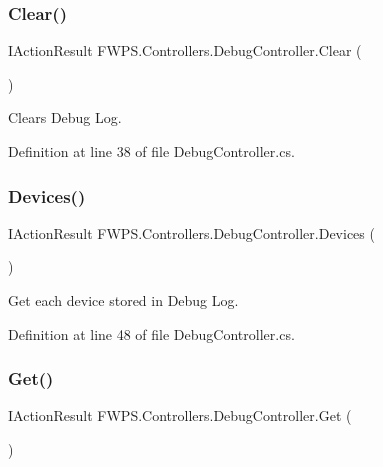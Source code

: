 \subsubsection{\texorpdfstring{Clear()}{Clear()}}
{\footnotesize\ttfamily I\+Action\+Result F\+W\+P\+S.\+Controllers.\+Debug\+Controller.\+Clear (\begin{DoxyParamCaption}{ }\end{DoxyParamCaption})}



Clears Debug Log. 



Definition at line 38 of file Debug\+Controller.\+cs.

\mbox{\label{class_f_w_p_s_1_1_controllers_1_1_debug_controller_a43de8949791ed24a59188323e1e9f9cd}} 
\subsubsection{\texorpdfstring{Devices()}{Devices()}}
{\footnotesize\ttfamily I\+Action\+Result F\+W\+P\+S.\+Controllers.\+Debug\+Controller.\+Devices (\begin{DoxyParamCaption}{ }\end{DoxyParamCaption})}



Get each device stored in Debug Log. 



Definition at line 48 of file Debug\+Controller.\+cs.

\mbox{\label{class_f_w_p_s_1_1_controllers_1_1_debug_controller_a2cb38aa6a0759e89ba745e7b02db37f9}} 
\subsubsection{\texorpdfstring{Get()}{Get()}}
{\footnotesize\ttfamily I\+Action\+Result F\+W\+P\+S.\+Controllers.\+Debug\+Controller.\+Get (\begin{DoxyParamCaption}{ }\end{DoxyParamCaption})}



